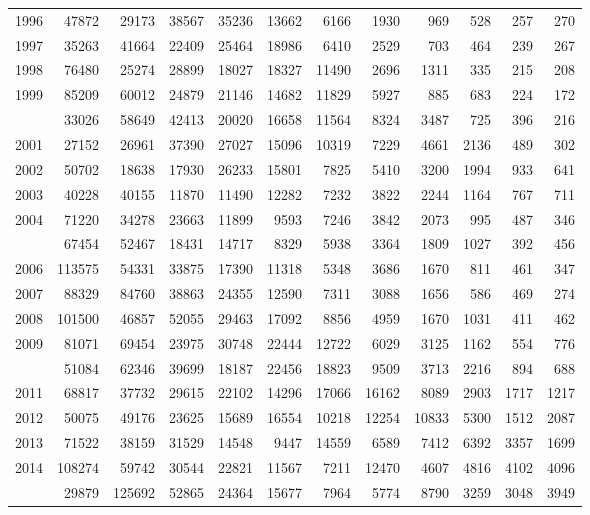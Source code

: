 \documentclass[
]{article}
\begin{document}
\begin{longtable}[t]{lrrrrrrrrrrr}
1996 & 47872 & 29173 & 38567 & 35236 & 13662 & 6166 & 1930 & 969 & 528 & 257 & 270\\
1997 & 35263 & 41664 & 22409 & 25464 & 18986 & 6410 & 2529 & 703 & 464 & 239 & 267\\
1998 & 76480 & 25274 & 28899 & 18027 & 18327 & 11490 & 2696 & 1311 & 335 & 215 & 208\\
1999 & 85209 & 60012 & 24879 & 21146 & 14682 & 11829 & 5927 & 885 & 683 & 224 & 172\\
\addlinespace
2000 & 33026 & 58649 & 42413 & 20020 & 16658 & 11564 & 8324 & 3487 & 725 & 396 & 216\\
2001 & 27152 & 26961 & 37390 & 27027 & 15096 & 10319 & 7229 & 4661 & 2136 & 489 & 302\\
2002 & 50702 & 18638 & 17930 & 26233 & 15801 & 7825 & 5410 & 3200 & 1994 & 933 & 641\\
2003 & 40228 & 40155 & 11870 & 11490 & 12282 & 7232 & 3822 & 2244 & 1164 & 767 & 711\\
2004 & 71220 & 34278 & 23663 & 11899 & 9593 & 7246 & 3842 & 2073 & 995 & 487 & 346\\
\addlinespace
2005 & 67454 & 52467 & 18431 & 14717 & 8329 & 5938 & 3364 & 1809 & 1027 & 392 & 456\\
2006 & 113575 & 54331 & 33875 & 17390 & 11318 & 5348 & 3686 & 1670 & 811 & 461 & 347\\
2007 & 88329 & 84760 & 38863 & 24355 & 12590 & 7311 & 3088 & 1656 & 586 & 469 & 274\\
2008 & 101500 & 46857 & 52055 & 29463 & 17092 & 8856 & 4959 & 1670 & 1031 & 411 & 462\\
2009 & 81071 & 69454 & 23975 & 30748 & 22444 & 12722 & 6029 & 3125 & 1162 & 554 & 776\\
\addlinespace
2010 & 51084 & 62346 & 39699 & 18187 & 22456 & 18823 & 9509 & 3713 & 2216 & 894 & 688\\
2011 & 68817 & 37732 & 29615 & 22102 & 14296 & 17066 & 16162 & 8089 & 2903 & 1717 & 1217\\
2012 & 50075 & 49176 & 23625 & 15689 & 16554 & 10218 & 12254 & 10833 & 5300 & 1512 & 2087\\
2013 & 71522 & 38159 & 31529 & 14548 & 9447 & 14559 & 6589 & 7412 & 6392 & 3357 & 1699\\
2014 & 108274 & 59742 & 30544 & 22821 & 11567 & 7211 & 12470 & 4607 & 4816 & 4102 & 4096\\
\addlinespace
2015 & 29879 & 125692 & 52865 & 24364 & 15677 & 7964 & 5774 & 8790 & 3259 & 3048 & 3949\\

\end{longtable}
\end{document}
